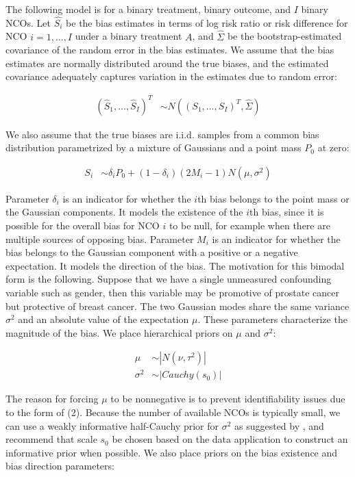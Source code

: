 The following model is for a binary treatment, binary outcome, and $I$ binary NCOs. Let $\widehat{S_{i}}$ be the bias estimates in terms of log risk ratio or risk difference for NCO $i=1,...,I$ under a binary treatment $A$, and $\widehat{\Sigma}$ be the bootstrap-estimated covariance of the random error in the bias estimates. We assume that the bias estimates are normally distributed around the true biases, and the estimated covariance adequately captures variation in the estimates due to random error:

\begin{align}
(\widehat{S}_{1},...,\widehat{S}_{I})^T &\sim N((S_{1}, . . . , S_{I})^T, \widehat{\Sigma} )
\end{align}

We also assume that the true biases are i.i.d. samples from a common bias distribution parametrized by a mixture of Gaussians and a point mass $P_0$ at zero:

\begin{align}
    S_{i} &\sim \delta_i P_0 + (1-\delta_i) (2M_i - 1) N(\mu, \sigma^2)
\end{align}

Parameter $\delta_i$ is an indicator for whether the $i$th bias belongs to the point mass or the Gaussian components. It models the existence of the $i$th bias, since it is possible for the overall bias for NCO $i$ to be null, for example when there are multiple sources of opposing bias. Parameter $M_i$ is an indicator for whether the bias belongs to the Gaussian component with a positive or a negative expectation. It models the direction of the bias. The motivation for this bimodal form is the following. Suppose that we have a single unmeasured confounding variable such as gender, then this variable may be promotive of prostate cancer but protective of breast cancer. The two Gaussian modes share the same variance $\sigma^2$ and an absolute value of the expectation $\mu$. These parameters characterize the magnitude of the bias. We place hierarchical priors on $\mu$ and $\sigma^2$:

\begin{align}
    \mu &\sim |N(\nu, \tau^2)|\\
    \sigma^2 &\sim |Cauchy(s_0)|
\end{align}

The reason for forcing $\mu$ to be nonnegative is to prevent identifiability issues due to the form of (2). Because the number of available NCOs is typically small, we can use a weakly informative half-Cauchy prior for $\sigma^2$ as suggested by \cite{gelman2006prior}, and recommend that scale $s_0$ be chosen based on the data application to construct an informative prior when possible. We also place priors on the bias existence and bias direction parameters:

